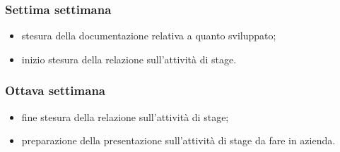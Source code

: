 {    \subsubsection{Settima settimana} 
    \begin{itemize}
        \item stesura della documentazione relativa a quanto sviluppato;
        \item inizio stesura della relazione sull'attività di stage.
    \end{itemize}

    \subsubsection{Ottava settimana} 
    \begin{itemize}
        \item fine stesura della relazione sull'attività di stage;
        \item preparazione della presentazione sull'attività di stage da fare in azienda.
    \end{itemize}
}

\newcommand{\totaleOre}{300}

\newcommand{\obiettiviObbligatori}{
	 \item \textbf{RO-1:} acquisizione delle competenze sulle tematiche relative alla blockchain e alle tecnologie associate;
	 \item \textbf{RO-2:} implementazione di un \textit{proof of concept} che permetta l'interazione con la blockchain di Commerc.io per il riconoscimento delle identità digitali e la trasmissione di documenti, tramite un'interfaccia grafica basilare;
	 \item \textbf{RO-3:} stesura della documentazione relativa ai risultati ottenuti nel corso delle varie fasi del progetto e alla gestione delle difficoltà incontrate;
	 \item \textbf{RO-4:} stesura della realzione riguardante il lavoro avor svolto durante tutto il periodo di stage.
}

\newcommand{\obiettiviDesiderabili}{
	 \item \textbf{RD-1:} implementazione di un'interfaccia web completa per il \textit{proof of concept}.
}

\newcommand{\obiettiviFacoltativi}{
	 \item \textbf{RF-1:} sviluppo di un'applicazione mobile in Flutter che offra le funzionalità richieste per il \textit{proof of concept}.
}
